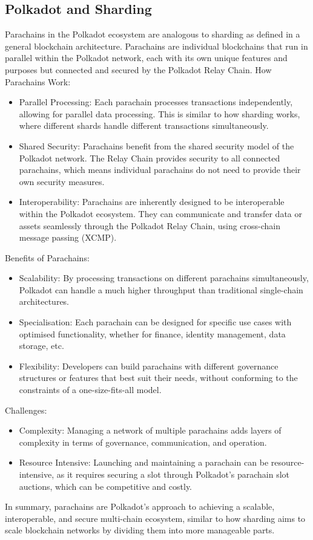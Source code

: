 \documentclass{tufte-handout}
\begin{document}
\subsection{Polkadot and Sharding}\label{sec:headings}
Parachains in the Polkadot ecosystem are analogous to sharding as defined in a general blockchain architecture. Parachains are individual blockchains that run in parallel within
the Polkadot network, each with its own unique features and purposes but connected and secured by the Polkadot Relay Chain.
How Parachains Work:
\begin{itemize}
\item Parallel Processing: Each parachain processes transactions independently, allowing for parallel data processing. This is similar to how sharding works, where different shards handle different transactions simultaneously.
\item Shared Security: Parachains benefit from the shared security model of the Polkadot network. The Relay Chain provides security to all connected parachains, which means individual parachains do not need to provide their own security measures.
\item Interoperability: Parachains are inherently designed to be interoperable within the Polkadot ecosystem. They can communicate and transfer data or assets seamlessly through the Polkadot Relay Chain, using cross-chain message passing (XCMP).
\end{itemize}
Benefits of Parachains:
\begin{itemize}
\item Scalability: By processing transactions on different parachains simultaneously, Polkadot can handle a much higher throughput than traditional single-chain architectures.
\item Specialisation: Each parachain can be designed for specific use cases with optimised functionality, whether for finance, identity management, data storage, etc.
\item Flexibility: Developers can build parachains with different governance structures or features that best suit their needs, without conforming to the constraints of a one-size-fits-all model.
\end{itemize}
Challenges:
\begin{itemize}
\item Complexity: Managing a network of multiple parachains adds layers of complexity in terms of governance, communication, and operation.
\item Resource Intensive: Launching and maintaining a parachain can be resource-intensive, as it requires securing a slot through Polkadot's parachain slot auctions, which can be
competitive and costly.
\end{itemize}
In summary, parachains are Polkadot's approach to achieving a scalable, interoperable, and secure multi-chain ecosystem, similar to how sharding aims to scale blockchain networks by dividing them into more manageable parts.
\end{document}
